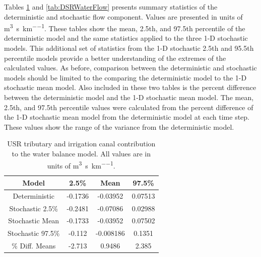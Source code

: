 \begin{linenumbers}
Tables \ref{tab:USRWaterFlow} and \ref{tab:DSRWaterFlow} presents summary statistics of the deterministic and stochastic flow component.  Values are presented in units of \si{\cubic\meter\per\second\per\kilo\meter}.   These tables show the mean, 2.5th, and 97.5th percentile of the deterministic model and the same statistics applied to the three 1-D stochastic models.  This additional set of statistics from the 1-D stochastic 2.5th and 95.5th percentile models provide a better understanding of the extremes of the calculated values.  As before, comparison between the deterministic and stochastic models should be limited to the comparing the deterministic model to the 1-D stochastic mean model.  Also included in these two tables is the percent difference between the deterministic model and the 1-D stochastic mean model.  The mean, 2.5th, and 97.5th percentile values were calculated from the percent difference of the 1-D stochastic mean model from the deterministic model at each time step.  These values show the range of the variance from the deterministic model.

\begin{table}[htbp]
\centering
\caption[USR tributary and irrigation canal contribution to the water balance model.]{USR tributary and irrigation canal contribution to the water balance model.  All values are in units of \si{\cubic\meter\per\second\per\kilo\meter}.}
\label{tab:USRWaterFlow}
\begin{tabular}{c|ccc}
	\toprule
	Model& 2.5\% & Mean & 97.5\% \\
	\midrule
	\midrule
	Deterministic    & -0.1736&	-0.03952&	0.07513\\
	\midrule
	Stochastic 2.5\% &  -0.2481&	-0.07086&	0.02988\\
	Stochastic Mean  &  -0.1733&	-0.03952&	0.07502\\
	Stochastic 97.5\%&  -0.112&	-0.008186&	0.1351\\     
	\midrule
	\% Diff. Means &	-2.713&	0.9486&	2.385\\
	\bottomrule
\end{tabular}
\end{table}


\end{linenumbers}
